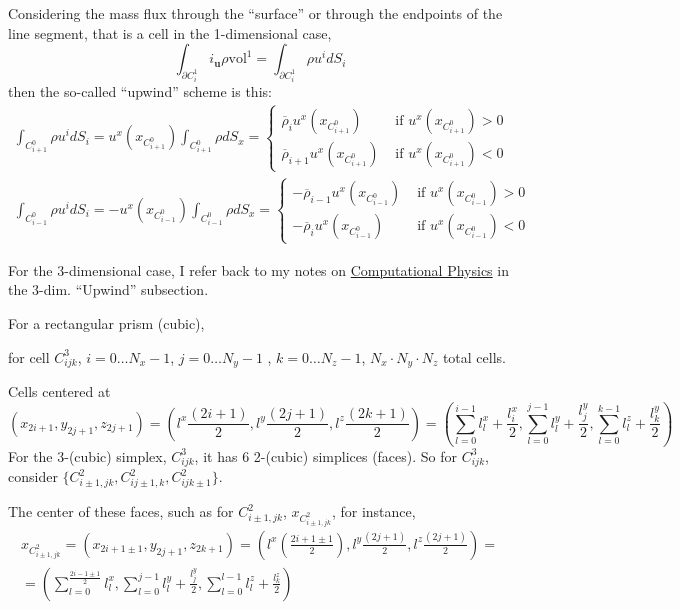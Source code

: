 \documentclass[10pt, landscape]{amsart}
\begin{document}
Considering the mass flux through the ``surface'' or through the endpoints of the line segment, that is a cell in the 1-dimensional case,
\[
\int_{\partial C_i^1} i_{\mathbf{u}} \rho \text{vol}^1 = \int_{ \partial C_i^1} \rho u^i dS_i
\]
then the so-called ``upwind'' scheme is this:
\[
\begin{gathered}
  \int_{C^0_{i+1}} \rho u^i dS_i = u^x(x_{C^0_{i+1}}) \int_{C^0_{i+1} } \rho dS_x = \begin{cases} 
    \overline{\rho}_iu^x(x_{C^0_{i+1}} ) & \text{ if } u^x(x_{C^0_{i+1}}) > 0 \\
    \overline{\rho}_{i+1}u^x(x_{C^0_{i+1}} ) & \text{ if } u^x(x_{C^0_{i+1}}) < 0
    \end{cases} \\
  \int_{C^0_{i-1}} \rho u^i dS_i = -u^x(x_{C^0_{i-1}}) \int_{C^0_{i-1} } \rho dS_x = \begin{cases} 
    -\overline{\rho}_{i-1}u^x(x_{C^0_{i-1}} ) & \text{ if } u^x(x_{C^0_{i-1}}) > 0 \\
    -\overline{\rho}_{i}u^x(x_{C^0_{i-1}} ) & \text{ if } u^x(x_{C^0_{i-1}}) < 0
    \end{cases} 
\end{gathered}
\]


For the 3-dimensional case, I refer back to my notes on \href{https://github.com/ernestyalumni/CompPhys/blob/master/LaTeXandpdfs/CompPhys.pdf}{Computational Physics} in the 3-dim. ``Upwind'' subsection. 


For a rectangular prism (cubic),

for cell $C^3_{ijk}$, $i=0 \dots N_x-1$, $j=0 \dots N_y-1$ , $k=0 \dots N_z-1$, $N_x\cdot N_y \cdot N_z$ total cells.

Cells centered at
\[
(x_{2i+1}, y_{2j+1}, z_{2j+1}) = (l^x \frac{ (2i+1)}{2} , l^y \frac{(2j+1)}{2}, l^z \frac{(2k+1)}{2} ) = \left( \sum_{l=0}^{i-1} l_l^x + \frac{l_i^x}{2} , \sum_{l=0}^{j-1}l_l^y + \frac{l_j^y}{2}, \sum_{l=0}^{k-1}l_l^z + \frac{l_k^y}{2}  \right)
\]
For the 3-(cubic) simplex, $C^3_{ijk}$, it has 6 2-(cubic) simplices (faces).  So for $C_{ijk}^3$, consider $\lbrace C^2_{i\pm 1, jk}, C^2_{ij\pm 1,k}, C^2_{ijk\pm 1}\rbrace$.

The center of these faces, such as for $C^2_{i\pm 1, jk}$, $x_{ C^2_{i\pm 1, jk} }$, for instance,
\[
\begin{aligned}
  x_{C^2_{i\pm 1,jk}} = (x_{2i+1\pm 1},y_{2j+1},z_{2k+1}) = (l^x\left( \frac{2i+1\pm 1}{2}\right) , l^y\frac{(2j+1)}{2},  l^z\frac{(2j+1)}{2} ) = \\
  = \left( \sum_{l=0}^{ \frac{2i - 1 \pm 1 }{2} } l_l^x, \sum_{l=0}^{j-1} l_l^y + \frac{l_j^y}{2}, \sum_{l=0}^{l-1} l_l^z + \frac{l_k^z}{2} \right) 
  \end{aligned}
\]
\end{document}
